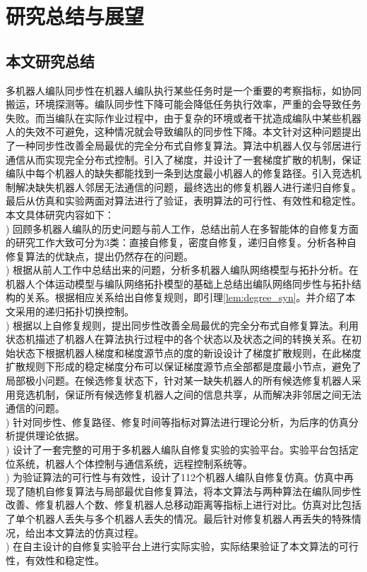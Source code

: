 \chapter{研究总结与展望}

\section{本文研究总结}
多机器人编队同步性在机器人编队执行某些任务时是一个重要的考察指标，如协同搬运，环境探测等。编队同步性下降可能会降低任务执行效率，严重的会导致任务失败。而当编队在实际作业过程中，由于复杂的环境或者干扰造成编队中某些机器人的失效不可避免，这种情况就会导致编队的同步性下降。本文针对这种问题提出了一种同步性改善全局最优的完全分布式自修复算法。算法中机器人仅与邻居进行通信从而实现完全分布式控制。引入了梯度，并设计了一套梯度扩散的机制，保证编队中每个机器人的缺失都能找到一条到达度最小机器人的修复路径。引入竞选机制解决缺失机器人邻居无法通信的问题，最终选出的修复机器人进行递归自修复。最后从仿真和实验两面对算法进行了验证，表明算法的可行性、有效性和稳定性。本文具体研究内容如下：\\
) 回顾多机器人编队的历史问题与前人工作，总结出前人在多智能体的自修复方面的研究工作大致可分为3类：直接自修复，密度自修复，递归自修复。分析各种自修复算法的优缺点，提出仍然存在的问题。\\
) 根据从前人工作中总结出来的问题，分析多机器人编队网络模型与拓扑分析。在机器人个体运动模型与编队网络拓扑模型的基础上总结出编队网络同步性与拓扑结构的关系。根据相应关系给出自修复规则，即引理\ref{lem:degree_syn}。并介绍了本文采用的递归拓扑切换控制。\\
) 根据以上自修复规则，提出同步性改善全局最优的完全分布式自修复算法。利用状态机描述了机器人在算法执行过程中的各个状态以及状态之间的转换关系。在初始状态下根据机器人梯度和梯度源节点的度的新设设计了梯度扩散规则，在此梯度扩散规则下形成的稳定梯度分布可以保证梯度源节点全部都是度最小节点，避免了局部极小问题。在候选修复状态下，针对某一缺失机器人的所有候选修复机器人采用竞选机制，保证所有候选修复机器人之间的信息共享，从而解决非邻居之间无法通信的问题。\\
) 针对同步性、修复路径、修复时间等指标对算法进行理论分析，为后序的仿真分析提供理论依据。\\
) 设计了一套完整的可用于多机器人编队自修复实验的实验平台。实验平台包括定位系统，机器人个体控制与通信系统，远程控制系统等。\\
) 为验证算法的可行性与有效性，设计了112个机器人编队自修复仿真。仿真中再现了随机自修复算法与局部最优自修复算法，将本文算法与两种算法在编队同步性改善、修复机器人个数、修复机器人总移动距离等指标上进行对比。仿真对比包括了单个机器人丢失与多个机器人丢失的情况。最后针对修复机器人再丢失的特殊情况，给出本文算法的仿真过程。\\
) 在自主设计的自修复实验平台上进行实际实验，实际结果验证了本文算法的可行性，有效性和稳定性。

